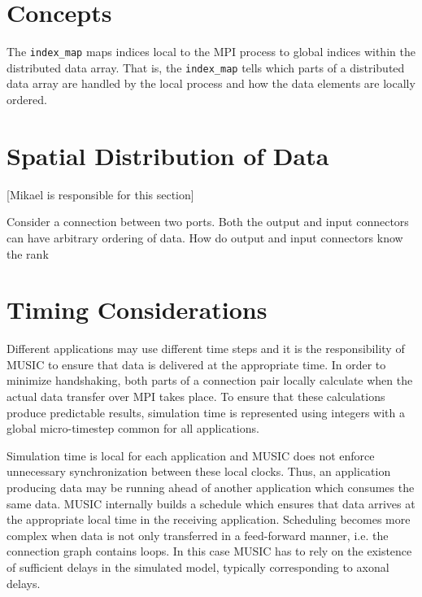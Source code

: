 \documentclass[a4paper]{report}
\newcommand{\responsible}[1]%
{{\color{red}[#1 is responsible for this section]}}
\begin{document}
\section{Concepts}

The \lstinline|index_map| maps indices local to the MPI process to global
indices within the distributed data array.  That is, the
\lstinline|index_map| tells which parts of a distributed data array are
handled by the local process and how the data elements are locally
ordered.

\section{Spatial Distribution of Data}
\responsible{Mikael}

Consider a connection between two ports.  Both the output and input
connectors can have arbitrary ordering of data.  How do output and
input connectors know the rank

\section{Timing Considerations}

Different applications may use different time steps and it is the
responsibility of MUSIC to ensure that data is delivered at the
appropriate time.  In order to minimize handshaking, both parts of a
connection pair locally calculate when the actual data transfer over
MPI takes place.  To ensure that these calculations produce
predictable results, simulation time is represented using integers
with a global micro-timestep common for all
applications.

Simulation time is local for each application
and MUSIC does not enforce unnecessary synchronization between these
local clocks.  Thus, an application producing data may be running
ahead of another application which consumes the same data.  MUSIC
internally builds a schedule which ensures that data arrives at the
appropriate local time in the receiving application.  Scheduling
becomes more complex when data is not only transferred in a
feed-forward manner, i.e. the connection graph contains loops.  In
this case MUSIC has to rely on the existence of sufficient delays in
the simulated model, typically corresponding to axonal
delays.
\end{document}
